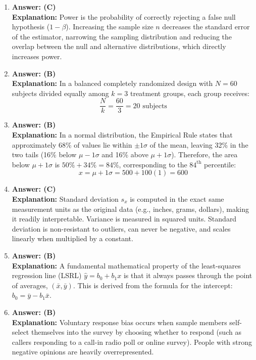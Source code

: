 \begin{enumerate}[leftmargin=1.5em]
  \item \textbf{Answer: (C)} \\
  \textbf{Explanation:} Power is the probability of correctly rejecting a false null hypothesis ($1 - \beta$). Increasing the sample size $n$ decreases the standard error of the estimator, narrowing the sampling distribution and reducing the overlap between the null and alternative distributions, which directly increases power.

  \item \textbf{Answer: (B)} \\
  \textbf{Explanation:} In a balanced completely randomized design with $N = 60$ subjects divided equally among $k = 3$ treatment groups, each group receives:
  \[ \frac{N}{k} = \frac{60}{3} = 20\text{ subjects} \]

  \item \textbf{Answer: (B)} \\
  \textbf{Explanation:} In a normal distribution, the Empirical Rule states that approximately 68\% of values lie within $\pm 1\sigma$ of the mean, leaving 32\% in the two tails (16\% below $\mu - 1\sigma$ and 16\% above $\mu + 1\sigma$). Therefore, the area below $\mu + 1\sigma$ is $50\% + 34\% = 84\%$, corresponding to the $84^{\text{th}}$ percentile:
  \[ x = \mu + 1\sigma = 500 + 100(1) = 600 \]

  \item \textbf{Answer: (C)} \\
  \textbf{Explanation:} Standard deviation $s_x$ is computed in the exact same measurement units as the original data (e.g., inches, grams, dollars), making it readily interpretable. Variance is measured in squared units. Standard deviation is non-resistant to outliers, can never be negative, and scales linearly when multiplied by a constant.

  \item \textbf{Answer: (B)} \\
  \textbf{Explanation:} A fundamental mathematical property of the least-squares regression line (LSRL) $\hat{y} = b_0 + b_1 x$ is that it always passes through the point of averages, $(\bar{x}, \bar{y})$. This is derived from the formula for the intercept: $b_0 = \bar{y} - b_1 \bar{x}$.

  \item \textbf{Answer: (B)} \\
  \textbf{Explanation:} Voluntary response bias occurs when sample members self-select themselves into the survey by choosing whether to respond (such as callers responding to a call-in radio poll or online survey). People with strong negative opinions are heavily overrepresented.


\end{enumerate}
